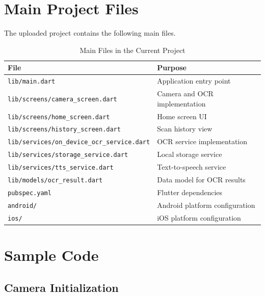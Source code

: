 \documentclass[12pt,a4paper]{report}
\begin{document}

\appendix

\chapter{Main Project Files}

The uploaded project contains the following main files.

\begin{table}[H]
\centering
\caption{Main Files in the Current Project}
\begin{tabular}{|p{6cm}|p{5cm}|}
\hline
\textbf{File} & \textbf{Purpose} \\ \hline
\texttt{lib/main.dart} & Application entry point \\ \hline
\texttt{lib/screens/camera\_screen.dart} & Camera and OCR implementation \\ \hline
\texttt{lib/screens/home\_screen.dart} & Home screen UI \\ \hline
\texttt{lib/screens/history\_screen.dart} & Scan history view \\ \hline
\texttt{lib/services/on\_device\_ocr\_service.dart} & OCR service implementation \\ \hline
\texttt{lib/services/storage\_service.dart} & Local storage service \\ \hline
\texttt{lib/services/tts\_service.dart} & Text-to-speech service \\ \hline
\texttt{lib/models/ocr\_result.dart} & Data model for OCR results \\ \hline
\texttt{pubspec.yaml} & Flutter dependencies \\ \hline
\texttt{android/} & Android platform configuration \\ \hline
\texttt{ios/} & iOS platform configuration \\ \hline
\end{tabular}
\end{table}

\chapter{Sample Code}

\section{Camera Initialization}
\end{document}

